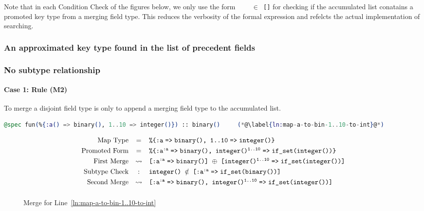 Note that in each Condition Check of the figures below, we only use the form \texttt{\ETK\,\,\,\,$\in$ [\prokey{\ETK}{$\prm{\ETT}$}\fto \ETT]} for checking if the accumulated list conatains a promoted key type from a merging field type. This reduces the verbosity of the formal expression and refelcts the actual implementation of searching.

\subsubsection*{An approximated key type found in the list of precedent fields}

\subsubsection*{No subtype relationship}

\paragraph{Case 1: Rule \textsc{(M2)}}
To merge a disjoint field type is only to append a merging field type to the accumulated list.

\begin{lstlisting}[language=Elixir, firstnumber=last]
@spec fun(%{:a() => binary(), 1..10 => integer()}) :: binary()     (*@\label{ln:map-a-to-bin-1..10-to-int}@*)
\end{lstlisting}

\begin{figure}[H]
   \[\begin{array}{rcl}
      \text{Map Type} 
      &=& \texttt{\%\{:a\fto binary(), 1..10\fto integer()\}}
      \\[0.8ex]
      \text{Promoted Form}
      &=& \texttt{\%\{\prokey{:a}{:a}\fto binary(), \prokey{integer()}{1..10}\fto if\_set(integer())\}}
      \\[0.8ex]
      \text{First Merge}
      &\leadsto& \texttt{[\prokey{:a}{:a}\fto binary()] $\oplus$ [\prokey{integer()}{1..10}\fto if\_set(integer())]}
      \\[0.8ex]
      \text{Subtype Check}
      &:& \texttt{integer() $\notin$ [\prokey{:a}{:a}\fto if\_set(binary())]}
      \\[0.8ex]
      \text{Second Merge}
      &\leadsto& \texttt{[\prokey{:a}{:a}\fto binary(), \prokey{integer()}{1..10}\fto if\_set(integer())]}
      \nl
   \end{array}\]
   \caption{Merge for Line~\ref{ln:map-a-to-bin-1..10-to-int}}
\end{figure}

